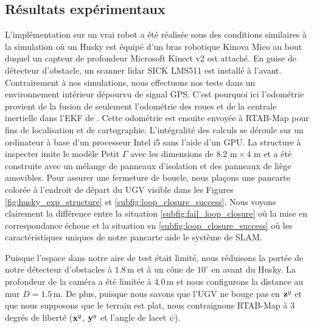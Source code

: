 \subsection{Résultats expérimentaux}

L'implémentation sur un vrai robot a été réalisée sous des conditions similaires à la simulation où un Husky est équipé d'un bras robotique Kinova Mico au bout duquel un capteur de profondeur Microsoft Kinect v2 est attaché. En guise de détecteur d'obstacle, un scanner lidar SICK LMS511 est installé à l'avant. Contrairement à nos simulations, nous effectuons nos tests dans un environnement intérieur dépourvu de signal GPS. C'est pourquoi ici l'odométrie provient de la fusion de seulement l'odométrie des roues et de la centrale inertielle dans l'EKF de \citep{MooreEkf2014}. Cette odométrie est ensuite envoyée à RTAB-Map \citep{Labbe2014} pour fins de localisation et de cartographie. L'intégralité des calculs se déroule sur un ordinateur à base d'un processeur Intel i5 sans l'aide d'un GPU. La structure à inspecter imite le modèle Petit $\Gamma$ avec les dimensions de $8.2\text{ m} \times 4\text{ m}$ et a été construite avec un mélange de panneaux d'isolation et des panneaux de liège amovibles. Pour assurer une fermeture de boucle, nous plaçons une pancarte colorée à l'endroit de départ du UGV visible dans les Figures \ref{fig:husky_exp_structure} et \ref{subfig:loop_closure_success}. Nous voyons clairement la différence entre la situation \ref{subfig:fail_loop_closure} où la mise en correspondance échoue et la situation en \ref{subfig:loop_closure_success} où les caractéristiques uniques de notre pancarte aide le système de SLAM.

Puisque l'espace dans notre aire de test était limité, nous réduisons la portée de notre détecteur d'obstacles à $1.8\, \mathrm{m}$ et à un cône de $10^\circ$  en avant du Husky. La profondeur de la caméra a été limitée à $4.0\, \mathrm{m}$ et nous configurons la distance au mur $D=1.5\, \mathrm{m}$. De plus, puisque nous savons que l'UGV ne bouge pas en $\mathbf{z}^g$ et que nous supposons que le terrain est plat, nous contraignons RTAB-Map à $3$ degrés de liberté ($\mathbf{x}^g$, $\mathbf{y}^g$ et l'angle de lacet $\psi$).

